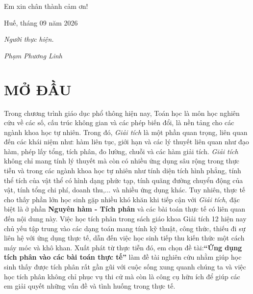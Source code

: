 \documentclass[12pt,a4paper,oneside]{book}
\theoremstyle{theorem}
\theoremstyle{definition}
\begin{document}
Em xin chân thành cảm ơn!
	
	\begin{flushright}
		Huế, tháng 09 năm 2026
		
		\textit{Người thực hiện.}
       
        \textit{Phạm Phương Linh}
	\end{flushright}
	
	
	
	
	
	\chapter*{MỞ ĐẦU}

           Trong chương trình giáo dục phổ thông hiện nay, Toán học là môn học nghiên cứu về các số, cấu trúc không gian và các phép biến đổi, là nền tảng cho các ngành khoa học tự nhiên. Trong đó, \textit{Giải tích} là một phần quan trọng, liên quan đến các khái niệm như: hàm liên tục, giới hạn và các lý thuyết liên quan như đạo hàm, phép lấy tổng, tích phân, đo lường, chuỗi và các hàm giải tích. \textit{Giải tích} không chỉ mang tính lý thuyết mà còn có nhiều ứng dụng sâu rộng trong thực tiễn và trong các ngành khoa học tự nhiên như tính diện tích hình phẳng, tính thể tích của vật thể có hình dạng phức tạp, tính quãng đường chuyển động của vật, tính tổng chi phí, doanh thu,... và nhiều ứng dụng khác.
           Tuy nhiên, thực tế cho thấy phần lớn học sinh gặp nhiều khó khăn khi tiếp cận với \textit{Giải tích}, đặc biệt là ở phần \textbf{Nguyên hàm - Tích phân} và các bài toán thực tế có liên quan đến nội dung này. Việc học tích phân trong sách giáo khoa Giải tích 12 hiện nay chủ yếu tập trung vào các dạng toán mang tính kỹ thuật, công thức, thiếu đi sự liên hệ với ứng dụng thực tế, dẫn đến việc học sinh tiếp thu kiến thức một cách máy móc và khô khan.
           Xuất phát từ thực tiễn đó, em chọn đề tài:\textbf{“Ứng dụng tích phân vào các bài toán thực tế”} làm đề tài nghiên cứu nhằm giúp học sinh thấy được tích phân rất gần gũi với cuộc sống xung quanh chúng ta và việc học tích phân không chỉ phục vụ thi cử mà còn là công cụ hữu ích để giúp các em giải quyết những vấn đề và tình huống trong thực tế.
            
\end{document}
